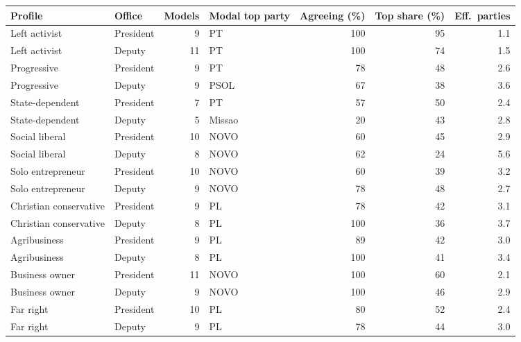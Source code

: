 \begin{tabular}{llrlrrr}
\toprule
Profile & Office & Models & Modal top party & Agreeing (\%) & Top share (\%) & Eff.\ parties \\
\midrule
Left activist & President & 9 & PT & 100 & 95 & 1.1 \\
Left activist & Deputy & 11 & PT & 100 & 74 & 1.5 \\
Progressive & President & 9 & PT & 78 & 48 & 2.6 \\
Progressive & Deputy & 9 & PSOL & 67 & 38 & 3.6 \\
State-dependent & President & 7 & PT & 57 & 50 & 2.4 \\
State-dependent & Deputy & 5 & Missao & 20 & 43 & 2.8 \\
Social liberal & President & 10 & NOVO & 60 & 45 & 2.9 \\
Social liberal & Deputy & 8 & NOVO & 62 & 24 & 5.6 \\
Solo entrepreneur & President & 10 & NOVO & 60 & 39 & 3.2 \\
Solo entrepreneur & Deputy & 9 & NOVO & 78 & 48 & 2.7 \\
Christian conservative & President & 9 & PL & 78 & 42 & 3.1 \\
Christian conservative & Deputy & 8 & PL & 100 & 36 & 3.7 \\
Agribusiness & President & 9 & PL & 89 & 42 & 3.0 \\
Agribusiness & Deputy & 8 & PL & 100 & 41 & 3.4 \\
Business owner & President & 11 & NOVO & 100 & 60 & 2.1 \\
Business owner & Deputy & 9 & NOVO & 100 & 46 & 2.9 \\
Far right & President & 10 & PL & 80 & 52 & 2.4 \\
Far right & Deputy & 9 & PL & 78 & 44 & 3.0 \\
\bottomrule
\end{tabular}
